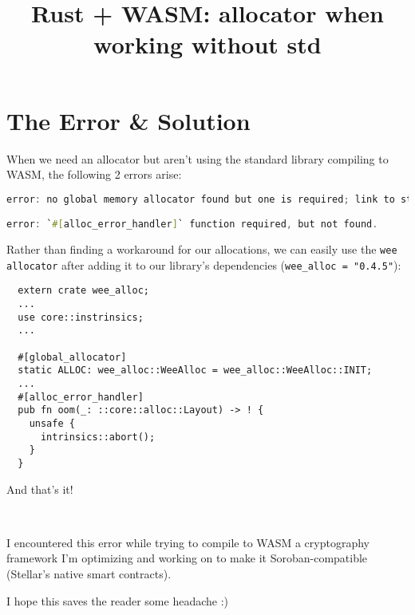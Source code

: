 \documentclass{article}
\title{Rust + WASM: allocator when working without std }
\begin{document}
\maketitle


\section{The Error \& Solution}

When we need an allocator but aren't using the standard library compiling to WASM, the following 2 errors arise:

\begin{lstlisting}[language=Rust]
error: no global memory allocator found but one is required; link to std or add `#[global_allocator]` to a static item that implements the GlobalAlloc trait.

error: `#[alloc_error_handler]` function required, but not found.
\end{lstlisting}

Rather than finding a workaround for our allocations, we can easily use the \texttt{wee allocator} after adding it to our library's dependencies (\texttt{wee_alloc = "0.4.5"}):

\begin{lstlisting}
  extern crate wee_alloc;
  ...
  use core::instrinsics;
  ...
  
  #[global_allocator]
  static ALLOC: wee_alloc::WeeAlloc = wee_alloc::WeeAlloc::INIT;
  ...
  #[alloc_error_handler]
  pub fn oom(_: ::core::alloc::Layout) -> ! {
    unsafe {
      intrinsics::abort();
    }
  }
\end{lstlisting}

And that's it!

\

I encountered this error while trying to compile to WASM a cryptography framework I'm optimizing and working on to make it Soroban-compatible (Stellar's native smart contracts).

I hope this saves the reader some headache :)
\end{document}

